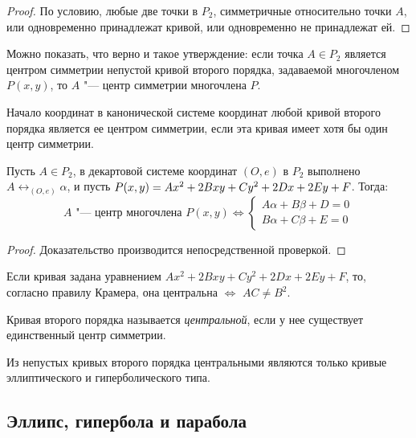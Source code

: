 \begin{proof}
	По условию, любые две точки в $P_2$, симметричные относительно точки $A$, или одновременно принадлежат кривой, или одновременно не принадлежат ей.
\end{proof}

\begin{note}
	Можно показать, что верно и такое утверждение: если точка $A \in P_2$ является центром симметрии непустой кривой второго порядка, задаваемой многочленом $P(x, y)$, то $A$ "--- центр симметрии многочлена $P$.
\end{note}

\begin{note}
	Начало координат в канонической системе координат любой кривой второго порядка является ее центром симметрии, если эта кривая имеет хотя бы один центр симметрии.
\end{note}

\begin{proposition}
	Пусть $A \in P_2$, в декартовой системе координат $(O, e)$ в $P_2$ выполнено $A \leftrightarrow_{(O, e)} \alpha$, и пусть $P(x, y) \hm{=} Ax^2 + 2Bxy + Cy^2 + 2Dx + 2Ey + F$. Тогда:
	\[A \text{ "--- центр многочлена } P(x, y) \Leftrightarrow \left\{\begin{aligned}
	A\alpha + B\beta + D = 0\\
	B\alpha + C\beta + E = 0
	\end{aligned}\right.\]
\end{proposition}

\begin{proof}
	Доказательство производится непосредственной проверкой.
\end{proof}

\begin{note}
	Если кривая задана уравнением $Ax^2 + 2Bxy + Cy^2 + 2Dx + 2Ey + F$, то, согласно правилу Крамера, она центральна $\Leftrightarrow$ $AC \ne B^2$.
\end{note}

\begin{definition}
	Кривая второго порядка называется \textit{центральной}, если у нее существует единственный центр симметрии.
\end{definition}

\begin{note}
	Из непустых кривых второго порядка центральными являются только кривые эллиптического и гиперболического типа.
\end{note}

\subsection{Эллипс, гипербола и парабола}

